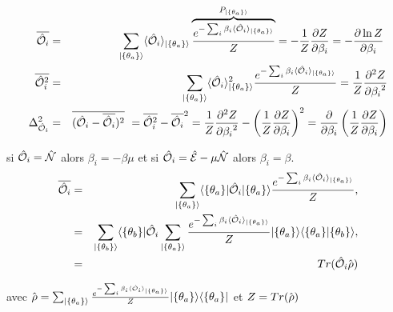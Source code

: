 	\begin{eqnarray}
		\overline{\operator{\mathcal{O}}_i } & = & \sum_{\vert \{\theta_a \} \rangle} 	\langle \operator{\mathcal{O}}_i \rangle_{\vert \{\theta_a \} \rangle} \overbrace{\frac{e^{-\sum_i \beta_i \langle \operator{\mathcal{O}}_i \rangle_{\vert \{\theta_a \} \rangle} }}{Z}}^{P_{\vert \{\theta_a \} \rangle}} = - \frac{1}{Z}\frac{ \partial Z }{ \partial \beta_i } =  - \frac{ \partial \ln Z }{ \partial \beta_i } \\
		\overline{\operator{\mathcal{O}}_i^2 } & = & \sum_{\vert \{\theta_a \} \rangle} 	\langle \operator{\mathcal{O}}_i \rangle_{\vert \{\theta_a \} \rangle}^2 \frac{e^{-\sum_i \beta_i \langle \operator{\mathcal{O}}_i \rangle_{\vert \{\theta_a \} \rangle} }}{Z} = \frac{1}{Z} \frac{ \partial^2 Z }{ {\partial \beta_i}^2 }\\
		\Delta_{\operator{\mathcal{O}}_i}^2  & = & 	\overline{(\operator{\mathcal{O}}_i - \overline{\operator{\mathcal{O}}_i})^2 }  = 	\overline{\operator{\mathcal{O}}_i^2 }  -  \overline{\operator{\mathcal{O}}_i }^2 = \frac{1}{Z} \frac{ \partial^2 Z }{ {\partial \beta_i}^2 } - \left ( \frac{1}{Z}\frac{ \partial Z }{ \partial \beta_i }\right )^2 = \frac{\partial}{\partial \beta_i } \left ( \frac{1}{Z} \frac{\partial Z}{\partial \beta_i } \right )	
	\end{eqnarray}
	
	si $\hat{\mathbf{\mathcal{O}}}_i = \hat{\mathbf{\mathcal{N}}}$ alors $\beta_i = - \beta \mu $ et si $\hat{\mathbf{\mathcal{O}}}_i = \hat{\mathbf{\mathcal{E}}} - \mu \hat{\mathbf{\mathcal{N}}} $ alors $\beta_i = \beta$.\\
	
	\begin{eqnarray}
		\overline{\hat{\mathbf{\mathcal{O}}}_i } & = & 	\sum_{\vert \{\theta_a \} \rangle} 	\langle \{\theta_a \}  \vert \hat{\mathbf{\mathcal{O}}}_i \vert \{\theta_a \}  \rangle \frac{e^{-\sum_i \beta_i \langle \hat{\mathbf{\mathcal{O}}}_i \rangle_{\vert \{\theta_a \} \rangle} }}{Z},\\
		& = & 	\sum_{\vert \{\theta_b \} \rangle} \langle \{\theta_b \}  \vert  \hat{\mathbf{\mathcal{O}}}_i \sum_{\vert \{\theta_a \} \rangle }\frac{e^{-\sum_i \beta_i \langle \hat{\mathbf{\mathcal{O}}}_i \rangle_{\vert \{\theta_a \} \rangle} }}{Z} \vert \{\theta_a \}  \rangle  	\langle \{\theta_a \}  \vert  \{\theta_b \}  \rangle ,\\
		& = & Tr (  \hat{\mathbf{\mathcal{O}}}_i \hat{\mathbf{\rho}}) 
	\end{eqnarray}
	
	avec $\hat{\mathbf{\rho}} = \sum_{\vert \{\theta_a \} \rangle }\frac{e^{-\sum_i \beta_i \langle \hat{\mathbf{\mathcal{O}}}_i \rangle_{\vert \{\theta_a \} \rangle} }}{Z} \vert \{\theta_a \}  \rangle   	\langle \{\theta_a \} \vert $ et $Z = Tr (  \hat{\mathbf{\rho}}) $\\


